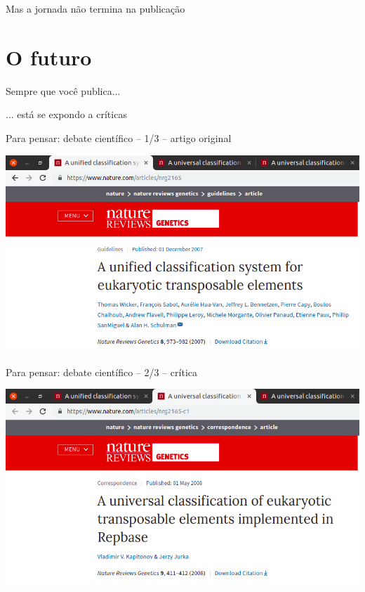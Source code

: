 \documentclass{beamer}
\begin{document}
\begin{frame}
  \begin{center}
    Mas a jornada não termina na publicação

    \vfill
  \end{center}
\end{frame}

\section{O futuro}

\begin{frame}
  \begin{center}
    \Large

    Sempre que você publica...

    \bigskip
    \bigskip
    ... está se expondo a críticas

    \bigskip
    \vfill
  \end{center}
\end{frame}

\begin{frame}{\tiny Para pensar: debate científico -- 1/3 -- artigo original}
  \begin{center}
    \includegraphics[width=\textwidth]{Encerramento/polemica1}
  \end{center}
\end{frame}

\begin{frame}{\tiny Para pensar: debate científico -- 2/3 -- crítica}
  \begin{center}
    \includegraphics[width=\textwidth]{Encerramento/polemica2}
  \end{center}
\end{frame}
\end{document}
